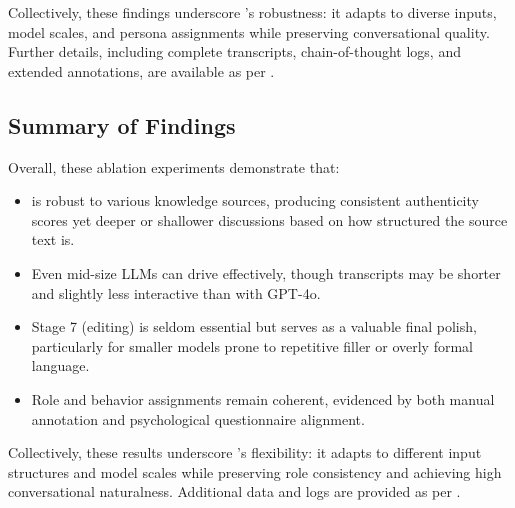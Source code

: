 Collectively, these findings underscore \pipeline{}’s robustness: it adapts to diverse inputs, model scales, and persona assignments while preserving conversational quality. Further details, including complete transcripts, chain-of-thought logs, and extended annotations, are available as per .




\subsection{Summary of Findings}
\label{sec:app_summary_findings}
Overall, these ablation experiments demonstrate that:
\begin{itemize}[leftmargin=1em]
    \item \pipeline{} is robust to various knowledge sources, producing consistent authenticity scores yet deeper or shallower discussions based on how structured the source text is.
    \item Even mid-size LLMs can drive \pipeline{} effectively, though transcripts may be shorter and slightly less interactive than with GPT-4o.
    \item Stage 7 (editing) is seldom essential but serves as a valuable final polish, particularly for smaller models prone to repetitive filler or overly formal language.
    \item Role and behavior assignments remain coherent, evidenced by both manual annotation and psychological questionnaire alignment.
\end{itemize}

Collectively, these results underscore \pipeline{}’s flexibility: it adapts to different input structures and model scales while preserving role consistency and achieving high conversational naturalness. 
Additional data and logs are provided as per .

